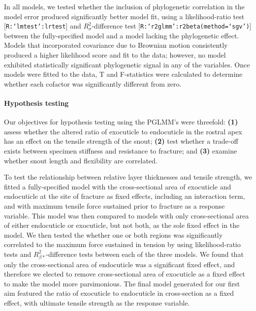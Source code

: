 \documentclass[twocolumn, linenumbers, superscriptaddress, nofootinbib]{revtex4-1}
\begin{document}
				In all models, we tested whether the inclusion of phylogenetic correlation in the model error produced significantly better model fit, using a likelihood-ratio test [\texttt{R:`lmtest':lrtest}] and $R^{2}_{\sigma}$-difference test [\texttt{R:`r2glmm':r2beta(method=`sgv')}] between the fully-specified model and a model lacking the phylogenetic effect.
				Models that incorporated covariance due to Brownian motion consistently produced a higher likelihood score and fit to the data; however, no model exhibited statistically significant phylogenetic signal in any of the variables.
				Once models were fitted to the data, T and F-statistics were calculated to determine whether each cofactor was significantly different from zero.
				
			\paragraph*{Hypothesis testing}
				Our objectives for hypothesis testing using the PGLMM's were threefold: \textbf{(1)} assess whether the altered ratio of exocuticle to endocuticle in the rostral apex has an effect on the tensile strength of the snout; \textbf{(2)} test whether a trade-off exists between specimen stiffness and resistance to fracture; and \textbf{(3)} examine whether snout length and flexibility are correlated.
				
				To test the relationship between relative layer thicknesses and tensile strength, we fitted a fully-specified model with the cross-sectional area of exocuticle and endocuticle at the site of fracture as fixed effects, including an interaction term, and with maximum tensile force sustained prior to fracture as a response variable.
				This model was then compared to models with only cross-sectional area of either endocuticle or exocuticle, but not both, as the sole fixed effect in the model.
				We then tested the whether one or both regions was significantly correlated to the maximum force sustained in tension by using likelihood-ratio tests and $R^{2}_{\beta*}$-difference tests between each of the three models.
				We found that only the cross-sectional area of endocuticle was a significant fixed effect, and therefore we elected to remove cross-sectional area of exocuticle as a fixed effect to make the model more parsimonious.
				The final model generated for our first aim featured the ratio of exocuticle to endocuticle in cross-section as a fixed effect, with ultimate tensile strength as the response variable.
				
\end{document}
